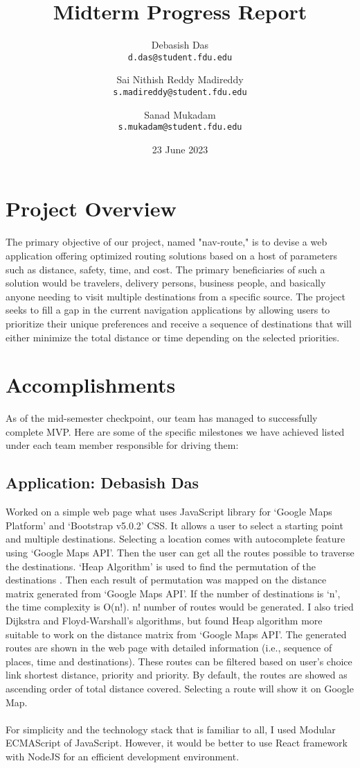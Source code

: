 \documentclass{article}
\title{Midterm Progress Report}
\author{
  Debasish Das\\
  \texttt{d.das@student.fdu.edu}
  \and
  Sai Nithish Reddy Madireddy\\
  \texttt{s.madireddy@student.fdu.edu}
  \and
  Sanad Mukadam\\
  \texttt{s.mukadam@student.fdu.edu}
}
\date{23 June 2023}
\begin{document}
\maketitle

\section{Project Overview}
The primary objective of our project, named "nav-route," is to devise a web application offering optimized routing solutions based on a host of parameters such as distance, safety, time, and cost. The primary beneficiaries of such a solution would be travelers, delivery persons, business people, and basically anyone needing to visit multiple destinations from a specific source. The project seeks to fill a gap in the current navigation applications by allowing users to prioritize their unique preferences and receive a sequence of destinations that will either minimize the total distance or time depending on the selected priorities.

\section{Accomplishments}
As of the mid-semester checkpoint, our team has managed to successfully complete MVP. Here are some of the specific milestones we have achieved listed under each team member responsible for driving them:

\subsection{Application: Debasish Das}
Worked on a simple web page what uses JavaScript library for ‘Google Maps Platform’ and ‘Bootstrap v5.0.2’ CSS. It allows a user to select a starting point and multiple destinations. Selecting a location comes with autocomplete feature using ‘Google Maps API’. Then the user can get all the routes possible to traverse the destinations. ‘Heap Algorithm’ is used to find the permutation of the destinations \cite{r1}. Then each result of permutation was mapped on the distance matrix generated from ‘Google Maps API’. If the number of destinations is ‘n’, the time complexity is O(n!). n! number of routes would be generated. I also tried Dijkstra and Floyd-Warshall’s algorithms, but found Heap algorithm more suitable to work on the distance matrix from ‘Google Maps API’. The generated routes are shown in the web page with detailed information (i.e., sequence of places, time and destinations). These routes can be filtered based on user’s choice link shortest distance, priority and priority. By default, the routes are showed as ascending order of total distance covered. Selecting a route will show it on Google Map.\\
\\
For simplicity and the technology stack that is familiar to all, I used Modular ECMAScript of JavaScript. However, it would be better to use React framework with NodeJS for an efficient development environment.
\end{document}
